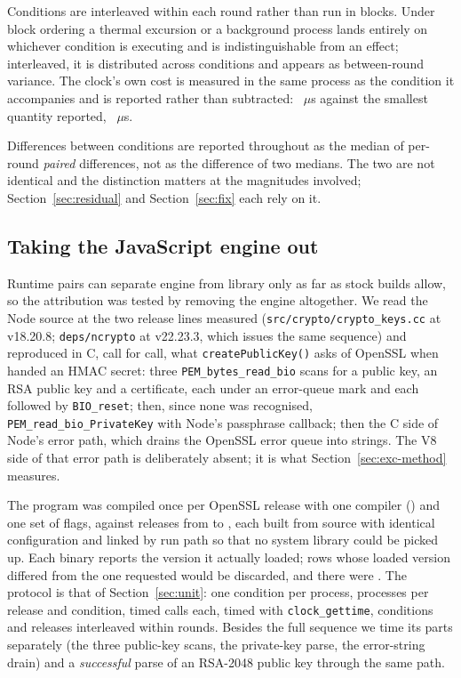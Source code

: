 \documentclass[preprint,12pt,authoryear]{elsarticle}
\begin{document}
Conditions are interleaved within each round rather than run in blocks. Under
block ordering a thermal excursion or a background process lands entirely on
whichever condition is executing and is indistinguishable from an effect;
interleaved, it is distributed across conditions and appears as between-round
variance. The clock's own cost is measured in the same process as the condition
it accompanies and is reported rather than subtracted: \HostTimerOverhead~$\mu$s
against the smallest quantity reported, \HostCreateSecretKey~$\mu$s.

Differences between conditions are reported throughout as the median of
per-round \emph{paired} differences, not as the difference of two medians. The
two are not identical and the distinction matters at the magnitudes involved;
Section~\ref{sec:residual} and Section~\ref{sec:fix} each rely on it.

\subsection{Taking the JavaScript engine out}

Runtime pairs can separate engine from library only as far as stock builds
allow, so the attribution was tested by removing the engine altogether. We read
the Node source at the two release lines measured
(\texttt{src/crypto/crypto\_keys.cc} at v18.20.8; \texttt{deps/ncrypto} at
v22.23.3, which issues the same sequence) and reproduced in C, call for call,
what \texttt{createPublicKey()} asks of OpenSSL when handed an HMAC secret:
three \texttt{PEM\_bytes\_read\_bio} scans for a public key, an RSA public key
and a certificate, each under an error-queue mark and each followed by
\texttt{BIO\_reset}; then, since none was recognised,
\texttt{PEM\_read\_bio\_PrivateKey} with Node's passphrase callback; then the
C side of Node's error path, which drains the OpenSSL error queue into
strings. The V8 side of that error path is deliberately absent; it is what
Section~\ref{sec:exc-method} measures.

The program was compiled once per OpenSSL release with one compiler
(\CProbeCompiler) and one set of flags, against \CProbeVersionCount{} releases
from \CProbeVersionFirst{} to \CProbeVersionLast{}, each built from source with
identical configuration and linked by run path so that no system library could
be picked up. Each binary reports the version it actually loaded; rows whose
loaded version differed from the one requested would be discarded, and there
were \CProbeIdentityMismatches. The protocol is that of
Section~\ref{sec:unit}: one condition per process, \CProbeInvocations{}
processes per release and condition, \CProbeCallsPerInvocation{} timed calls
each, timed with \texttt{clock\_gettime}, conditions and releases interleaved
within rounds. Besides the full sequence we time its parts separately (the
three public-key scans, the private-key parse, the error-string drain) and a
\emph{successful} parse of an RSA-2048 public key through the same path.
\end{document}
